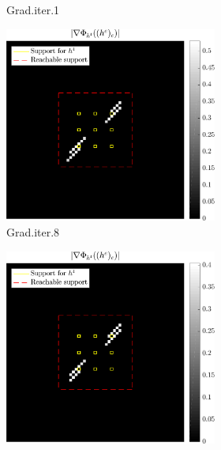 \begin{figure}[!ht]
\begin{subfigure}[b]{0.49\linewidth}
\begin{subfigure}[b]{0.49\linewidth}
	\caption{Grad.\@ iter.\@ 1}
	\end{subfigure}
	\begin{subfigure}[b]{0.49\linewidth}\centering
	\includegraphics[width=\linewidth]{figures/xp_grad_iterations/xp_128x128_sc2_angl1_K3_S3_node4_iter8_partgrad4_bestvalues.pdf}
	\caption{Grad.\@ iter.\@ 8}
	\end{subfigure}
	\begin{subfigure}[b]{0.49\linewidth}\centering
	\includegraphics[width=\linewidth]{figures/xp_grad_iterations/xp_128x128_sc2_angl1_K3_S3_node4_iter20_partgrad4_bestvalues.pdf}

\end{subfigure}
\end{subfigure}
\end{figure}
